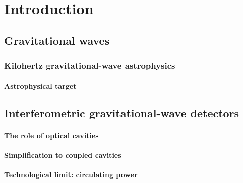 \chapter{Introduction} %

\section{Gravitational waves}


\subsection{Kilohertz gravitational-wave astrophysics} %


\subsubsection{Astrophysical target}



\section{Interferometric gravitational-wave detectors}



\subsubsection{The role of optical cavities}


\subsubsection{Simplification to coupled cavities}


\subsubsection{Technological limit: circulating power}

